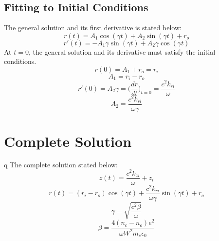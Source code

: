 \documentclass[11pt]{article}
\begin{document}
\subsection*{Fitting to Initial Conditions}
The general solution and its first derivative is stated below: 
$$r(t) = A_1\cos{(\gamma t)} + A_2 \sin{(\gamma t)} + r_o$$
$$r'(t) = -A_1\gamma\sin{(\gamma t)} + A_2 \gamma\cos{(\gamma t)}$$
At $t=0$, the general solution and its derivative must satisfy the initial conditions.
$$r(0) = A_1 + r_o = r_i$$
$$A_1 = r_i - r_o$$
$$r'(0) = A_2\gamma=\bigg(\frac{dr}{dt}\bigg)_{t=0}=\frac{c^2 k_{ri}}{\omega}$$
$$A_2 = \frac{c^2 k_{ri}}{\omega\gamma }$$
\section*{Complete Solution} q
The complete solution stated below:
$$z(t) = \frac{c^2 k_{zi}}{\omega} + z_i$$
$$r(t) = (r_i - r_o)\cos{(\gamma t)} + \frac{c^2 k_{ri}}{\omega\gamma }\sin{(\gamma t)} + r_o$$
$$\gamma = \sqrt{\frac{c^2\beta}{\omega}}$$
$$\beta = \frac{4(n_c-n_o)e^2}{\omega W^2m_e\epsilon_0}$$
\end{document}
